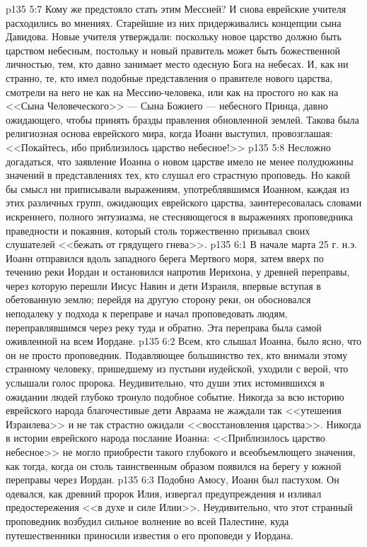 \vs p135 5:7 Кому же предстояло стать этим Мессией? И снова еврейские учителя расходились во мнениях. Старейшие из них придерживались концепции сына Давидова. Новые учителя утверждали: поскольку новое царство должно быть царством небесным, постольку и новый правитель может быть божественной личностью, тем, кто давно занимает место одесную Бога на небесах. И, как ни странно, те, кто имел подобные представления о правителе нового царства, смотрели на него не как на Мессию\hyp{}человека, или как на простого  но как на <<Сына Человеческого>> --- Сына Божиего --- небесного Принца, давно ожидающего, чтобы принять бразды правления обновленной землей. Такова была религиозная основа еврейского мира, когда Иоанн выступил, провозглашая: <<Покайтесь, ибо приблизилось царство небесное!>>
\vs p135 5:8 Несложно догадаться, что заявление Иоанна о новом царстве имело не менее полудюжины значений в представлениях тех, кто слушал его страстную проповедь. Но какой бы смысл ни приписывали выражениям, употреблявшимся Иоанном, каждая из этих различных групп, ожидающих еврейского царства, заинтересовалась словами искреннего, полного энтузиазма, не стесняющегося в выражениях проповедника праведности и покаяния, который столь торжественно призывал своих слушателей <<бежать от грядущего гнева>>.
\vs p135 6:1 В начале марта 25 г. н.э. Иоанн отправился вдоль западного берега Мертвого моря, затем вверх по течению реки Иордан и остановился напротив Иерихона, у древней переправы, через которую перешли Иисус Навин и дети Израиля, впервые вступая в обетованную землю; перейдя на другую сторону реки, он обосновался неподалеку у подхода к переправе и начал проповедовать людям, переправлявшимся через реку туда и обратно. Эта переправа была самой оживленной на всем Иордане.
\vs p135 6:2 Всем, кто слышал Иоанна, было ясно, что он не просто проповедник. Подавляющее большинство тех, кто внимали этому странному человеку, пришедшему из пустыни иудейской, уходили с верой, что услышали голос пророка. Неудивительно, что души этих истомившихся в ожидании людей глубоко тронуло подобное событие. Никогда за всю историю еврейского народа благочестивые дети Авраама не жаждали так <<утешения Израилева>> и не так страстно ожидали <<восстановления царства>>. Никогда в истории еврейского народа послание Иоанна: <<Приблизилось царство небесное>> не могло приобрести такого глубокого и всеобъемлющего значения, как тогда, когда он столь таинственным образом появился на берегу у южной переправы через Иордан.
\vs p135 6:3 Подобно Амосу, Иоанн был пастухом. Он одевался, как древний пророк Илия, извергал предупреждения и изливал предостережения <<в духе и силе Илии>>. Неудивительно, что этот странный проповедник возбудил сильное волнение во всей Палестине, куда путешественники приносили известия о его проповеди у Иордана.
